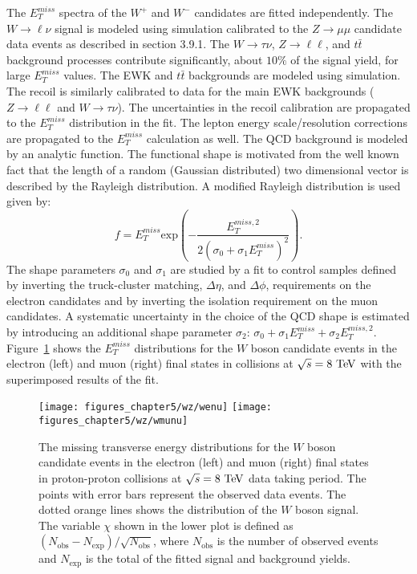 The $E_{T}^{miss}$ spectra of the $W^{+}$ and $W^{-}$ candidates are fitted independently. The $W \rightarrow \ell \nu$ signal is modeled using simulation calibrated to the $Z \rightarrow \mu\mu$ candidate data events as described in section 3.9.1. The $W \rightarrow \tau \nu$, $Z \rightarrow \ell\ell$, and $t\bar{t}$ background processes contribute significantly, about $10\%$ of the signal yield, for large $E_{T}^{miss}$ values. The EWK and $t\bar{t}$ backgrounds are modeled using simulation.  The recoil is similarly calibrated to data for the main EWK backgrounds ($Z \rightarrow \ell\ell$ and $W \rightarrow \tau \nu$). The uncertainties in the recoil calibration are propagated to the $E_{T}^{miss}$ distribution in the fit. The lepton energy scale/resolution corrections are propagated to the  $E_{T}^{miss}$ calculation as well. The QCD background is modeled by an analytic function. The functional shape is motivated from the well known fact that the length of a random (Gaussian distributed) two dimensional vector is described by the Rayleigh distribution. A modified Rayleigh distribution is used given by:
\begin{equation} \label{eq:rayleigh}
f = E_{T}^{miss} \mathrm{exp} \left(-\frac{E_{T}^{miss,2}}{2(\sigma_0+\sigma_1E_{T}^{miss})^2} \right).
\end{equation}  
The shape parameters $\sigma_0$ and $\sigma_1$ are studied by a fit to control samples defined by inverting the  truck-cluster matching,  $\Delta \eta$, and $\Delta \phi$, requirements on the electron candidates and by inverting the isolation requirement on the muon candidates. A systematic uncertainty in the choice of the QCD shape is estimated by introducing an additional shape parameter $\sigma_2$: $\sigma_0+\sigma_1E_{T}^{miss}+\sigma_2E_{T}^{miss,2}$. Figure~\ref{fig:W8} shows the $E_{T}^{miss}$ distributions for the  $W$ boson candidate events in the electron (left) and muon (right) final states in collisions at $\sqrt{s}=8~\mathrm{Te\kern -0.1em V}$ with the superimposed results of the fit.     
\begin{figure}[h]
\centering
\texttt{[image: figures\_chapter5/wz/wenu]}
\texttt{[image: figures\_chapter5/wz/wmunu]}
\caption{The missing transverse energy distributions for the $W$  boson candidate events in the electron (left) and muon (right) final states in proton-proton collisions at $\sqrt{s}=8~\mathrm{Te\kern -0.1em V}$ data taking period.  The points with error bars represent the observed data events. The dotted orange lines shows the distribution of the $W$ boson signal. The variable $\chi$ shown in the lower plot is defined as $(N_{\text{obs}}-N_{\text{exp}})/\sqrt{N_{\text{obs}}}$, where $N_{\text{obs}}$ is the number of observed events and $N_{\text{exp}}$ is the total of the fitted signal and background yields.
\label{fig:W8}}
\end{figure}
